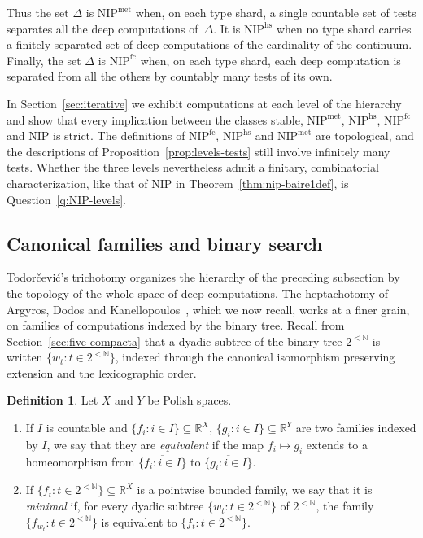\documentclass[psamsfonts]{amsart}
\theoremstyle{definition}
\newtheorem{defn}[thm]{Definition}
\theoremstyle{remark}
\newcommand{\NIP}{\text{NIP}}
\numberwithin{equation}{section}
\begin{document}
Thus the set $\Delta$ is $\NIP^{\mathrm{met}}$ when, on each type shard, a single countable set of tests separates all the deep computations of~$\Delta$.
It is $\NIP^{\mathrm{hs}}$ when no type shard carries a finitely separated set of deep computations of the cardinality of the continuum.
Finally, the set $\Delta$ is $\NIP^{\mathrm{fc}}$ when, on each type shard, each deep computation is separated from all the others by countably many tests of its own.

In Section~\ref{sec:iterative} we exhibit computations at each level of the hierarchy and show that every implication between the classes stable, $\NIP^{\mathrm{met}}$, $\NIP^{\mathrm{hs}}$, $\NIP^{\mathrm{fc}}$ and $\NIP$ is strict.
The definitions of $\NIP^{\mathrm{fc}}$, $\NIP^{\mathrm{hs}}$ and $\NIP^{\mathrm{met}}$ are topological, and the descriptions of Proposition~\ref{prop:levels-tests} still involve infinitely many tests.
Whether the three levels nevertheless admit a finitary, combinatorial characterization, like that of $\NIP$ in Theorem~\ref{thm:nip-baire1def}, is Question~\ref{q:NIP-levels}.

\subsection{Canonical families and binary search}
\label{sec:heptachotomy}

Todorčević's trichotomy organizes the hierarchy of the preceding subsection by the topology of the whole space of deep computations.
The heptachotomy of Argyros, Dodos and Kanellopoulos~\cite{argyros2008rosenthal}, which we now recall, works at a finer grain, on families of computations indexed by the binary tree.
Recall from Section~\ref{sec:five-compacta} that a dyadic subtree of the binary tree $2^{<\mathbb{N}}$ is written $\{w_t:t\in2^{<\mathbb{N}}\}$, indexed through the canonical isomorphism preserving extension and the lexicographic order.

\begin{defn}
  Let $X$ and $Y$ be Polish spaces.

  \begin{enumerate}
  \item
    If $I$ is countable and $\{f_i:i\in I\}\subseteq\mathbb{R}^X$, $\{g_i:i\in I\}\subseteq\mathbb{R}^Y$ are two families indexed by $I$, we say that they are \emph{equivalent} if the map $f_i\mapsto g_i$ extends to a homeomorphism from $\overline{\{f_i:i\in I\}}$ to $\overline{\{g_i:i\in I\}}$.
  \item
    If $\{f_t:t\in 2^{<\mathbb{N}}\}\subseteq\mathbb{R}^X$ is a pointwise bounded family, we say that it is \emph{minimal} if, for every dyadic subtree $\{w_t:t\in 2^{<\mathbb{N}}\}$ of $2^{<\mathbb{N}}$, the family $\{f_{w_t}:t\in 2^{<\mathbb{N}}\}$ is equivalent to $\{f_t:t\in 2^{<\mathbb{N}}\}$.
  \end{enumerate}
\end{defn}
\end{document}
